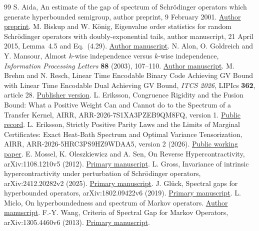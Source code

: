 \documentclass[11pt]{article}
\begin{document}
\begin{thebibliography}{99}
S. Aida, An estimate of the gap of spectrum of Schr\"odinger operators
which generate hyperbounded semigroup, author preprint, 9 February 2001.
\href{https://www.ms.u-tokyo.ac.jp/~aida/paper/preprint/handai3.pdf}{Author preprint}.
M. Biskup and W. K\"onig, Eigenvalue order statistics for random
Schr\"odinger operators with doubly-exponential tails,
author manuscript, 21 April 2015, Lemma~4.5 and Eq.~(4.29).
\href{https://www.wias-berlin.de/people/koenig/www/PPP4PAM-CMP-final.pdf}{Author manuscript}.
N. Alon, O. Goldreich and Y. Mansour,
Almost $k$-wise independence versus $k$-wise independence,
\emph{Information Processing Letters} \textbf{88} (2003), 107--110.
\href{https://www.wisdom.weizmann.ac.il/~oded/PSX/agm.pdf}{Author manuscript}.
M. Brehm and N. Resch,
Linear Time Encodable Binary Code Achieving GV Bound with Linear Time
Encodable Dual Achieving GV Bound,
\emph{ITCS 2026}, LIPIcs \textbf{362}, article 28.
\href{https://doi.org/10.4230/LIPIcs.ITCS.2026.28}{Publisher version}.
L. Eriksson,
Congruence Rigidity and the Fusion Bound: What a Positive Weight Can and
Cannot do to the Spectrum of a Transfer Kernel,
AIRR, ARR-2026-7S1XA3PZEB9QM8FQ, version 1.
\href{https://airr.science/papers/ARR-2026-7S1XA3PZEB9QM8FQ/versions/v1/}{Public record}.
L. Eriksson,
Strictly Positive Parity Laws and the Limits of Marginal Certificates:
Exact Heat-Bath Spectrum and Optimal Variance Tensorization,
AIRR, ARR-2026-5HRC3PS9HZ9WDAA5, version 2 (2026).
\href{https://airr.science/papers/ARR-2026-5HRC3PS9HZ9WDAA5/versions/v2/}{Public working paper}.
E. Mossel, K. Oleszkiewicz and A. Sen,
On Reverse Hypercontractivity, arXiv:1108.1210v5 (2012).
\href{https://arxiv.org/abs/1108.1210}{Primary manuscript}.
L. Gross, Invariance of intrinsic hypercontractivity under perturbation of
Schr\"odinger operators, arXiv:2412.20282v2 (2025).
\href{https://arxiv.org/abs/2412.20282}{Primary manuscript}.
J. Gl\"uck, Spectral gaps for hyperbounded operators,
arXiv:1802.09422v6 (2019).
\href{https://arxiv.org/abs/1802.09422}{Primary manuscript}.
L. Miclo, On hyperboundedness and spectrum of Markov operators.
\href{https://perso.math.univ-toulouse.fr/miclo/files/2012/04/hyperboundedness.pdf}{Author manuscript}.
F.-Y. Wang, Criteria of Spectral Gap for Markov Operators,
arXiv:1305.4460v6 (2013).
\href{https://arxiv.org/abs/1305.4460v6}{Primary manuscript}.
\end{thebibliography}
\end{document}
